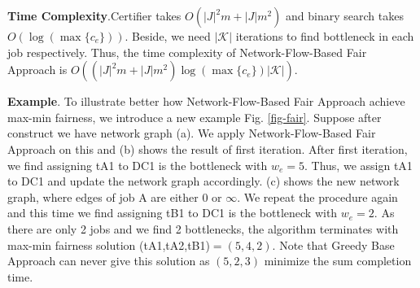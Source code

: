 
    
\textbf{Time Complexity}.Certifier takes $O(|J|^2m+|J|m^2)$ and binary search takes $O(\log(\max\{c_e\}) )$. Beside, we need $|\mathcal{K}|$ iterations to find bottleneck in each job respectively. Thus, the time complexity of Network-Flow-Based Fair Approach is $O((|J|^2m+|J|m^2)\log (\max \{c_e\}) |\mathcal{K}|)$.

\textbf{Example}. To illustrate better how Network-Flow-Based Fair Approach achieve max-min fairness, we introduce a new example Fig. \ref{fig-fair}. Suppose after construct we have network graph (a). We apply Network-Flow-Based Fair Approach on this and (b) shows the result of first iteration. After first iteration, we find assigning tA1 to DC1 is the bottleneck with $w_e=5$. Thus, we assign tA1 to DC1 and update the network graph accordingly. (c) shows the new network graph, where edges of job A are either $0$ or $\infty$. We repeat the procedure again and this time we find assigning tB1 to DC1 is the bottleneck with $w_e=2$. As there are only 2 jobs and we find 2 bottlenecks, the algorithm terminates with max-min fairness solution (tA1,tA2,tB1)$=(5,4,2)$.
Note that Greedy Base Approach can never give this solution as $(5,2,3)$ minimize the sum completion time.
    
